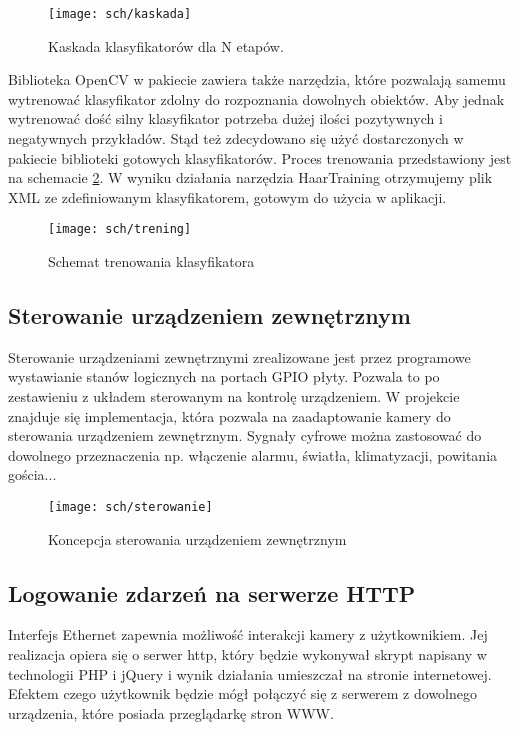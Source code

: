 \begin{figure}[bth]
\centering
{\texttt{[image: sch/kaskada]}}
\caption[Kaskada klasyfikatorów dla N etapów.]{Kaskada klasyfikatorów dla N etapów.}
\label{fig:kaskada}
\end{figure}

Biblioteka OpenCV w pakiecie zawiera także narzędzia, które pozwalają samemu wytrenować klasyfikator zdolny do rozpoznania dowolnych obiektów. Aby jednak wytrenować dość silny klasyfikator potrzeba dużej ilości pozytywnych i negatywnych przykładów. Stąd też zdecydowano się użyć dostarczonych w pakiecie biblioteki gotowych klasyfikatorów. Proces trenowania przedstawiony jest na schemacie \ref{fig:trening}. W wyniku działania narzędzia HaarTraining otrzymujemy plik XML ze zdefiniowanym klasyfikatorem, gotowym do użycia w aplikacji.

\begin{figure}[bth]
\centering
{\texttt{[image: sch/trening]}}
\caption[Schemat trenowania klasyfikatora]{Schemat trenowania klasyfikatora}
\label{fig:trening}
\end{figure}

\subsection{ Sterowanie urządzeniem zewnętrznym}
Sterowanie urządzeniami zewnętrznymi zrealizowane jest przez programowe wystawianie stanów logicznych na portach GPIO płyty. Pozwala to po zestawieniu z układem sterowanym na kontrolę urządzeniem. W projekcie znajduje się implementacja, która pozwala na zaadaptowanie kamery do sterowania urządzeniem zewnętrznym. Sygnały cyfrowe można zastosować do dowolnego przeznaczenia np. włączenie alarmu, światła, klimatyzacji, powitania gościa...

 \begin{figure}[bth]
\centering
{\texttt{[image: sch/sterowanie]}}
\caption[Koncepcja sterowania urządzeniem zewnętrznym]{Koncepcja sterowania urządzeniem zewnętrznym}
\label{fig:sterownie}
\end{figure}

\subsection{ Logowanie zdarzeń na serwerze HTTP}
Interfejs Ethernet zapewnia możliwość interakcji kamery z użytkownikiem.  Jej realizacja opiera się o serwer http, który  będzie wykonywał  skrypt napisany w technologii PHP i jQuery i wynik działania umieszczał na stronie internetowej.
Efektem czego użytkownik będzie mógł połączyć się z serwerem z dowolnego urządzenia, które posiada przeglądarkę stron WWW.  
